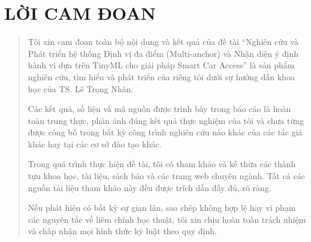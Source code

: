 \documentclass[a4paper,12pt,twoside]{report}
\begin{document}
\raggedbottom

\setcounter{secnumdepth}{4}
\setcounter{tocdepth}{4}
\begin{titlepage}
% 


\clearpage



% 


% 

% 


% 

\end{titlepage}
\restoregeometry

\clearpage
{}
{}
\section*{\MakeUppercase{LỜI CAM ĐOAN}}
\begin{quotation}
Tôi xin cam đoan toàn bộ nội dung và kết quả của đề tài “Nghiên cứu và Phát triển hệ thống Định vị đa điểm (Multi-anchor) và Nhận diện ý định hành vi dựa trên TinyML cho giải pháp Smart Car Access” là sản phẩm nghiên cứu, tìm hiểu và phát triển của riêng tôi dưới sự hướng dẫn khoa học của TS. Lê Trọng Nhân.

Các kết quả, số liệu và mã nguồn được trình bày trong báo cáo là hoàn toàn trung thực, phản ánh đúng kết quả thực nghiệm của tôi và chưa từng được công bố trong bất kỳ công trình nghiên cứu nào khác của các tác giả khác hay tại các cơ sở đào tạo khác.

Trong quá trình thực hiện đề tài, tôi có tham khảo và kế thừa các thành tựu khoa học, tài liệu, sách báo và các trang web chuyên ngành. Tất cả các nguồn tài liệu tham khảo này đều được trích dẫn đầy đủ, rõ ràng.

Nếu phát hiện có bất kỳ sự gian lận, sao chép không hợp lệ hay vi phạm các nguyên tắc về liêm chính học thuật, tôi xin chịu hoàn toàn trách nhiệm và chấp nhận mọi hình thức kỷ luật theo quy định.
\end{quotation}
\end{document}
